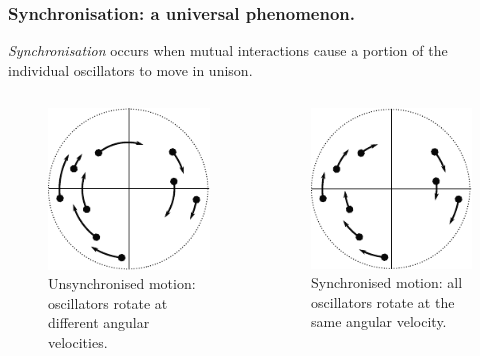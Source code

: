\documentclass[10pt,reqno]{beamer}
\begin{document}
\begin{frame}
\frametitle{Synchronisation: a universal phenomenon.}
\begin{center}
{\em Synchronisation} occurs when mutual interactions cause a portion of the individual oscillators to move in unison.
\end{center}
\begin{columns}
\begin{column}{0.49\textwidth}
	\begin{figure}
		\includegraphics[scale=0.80]{synch1.pdf}
		\caption{Unsynchronised motion: oscillators rotate at different angular velocities.}
	\end{figure}
\end{column}
\begin{column}{0.49\textwidth}
	\begin{figure}
		\includegraphics[scale=0.80]{synch2.pdf}
		\caption{Synchronised motion: all oscillators rotate at the same angular velocity.}
	\end{figure}
\end{column}
\end{columns}
\end{frame}
\end{document}
